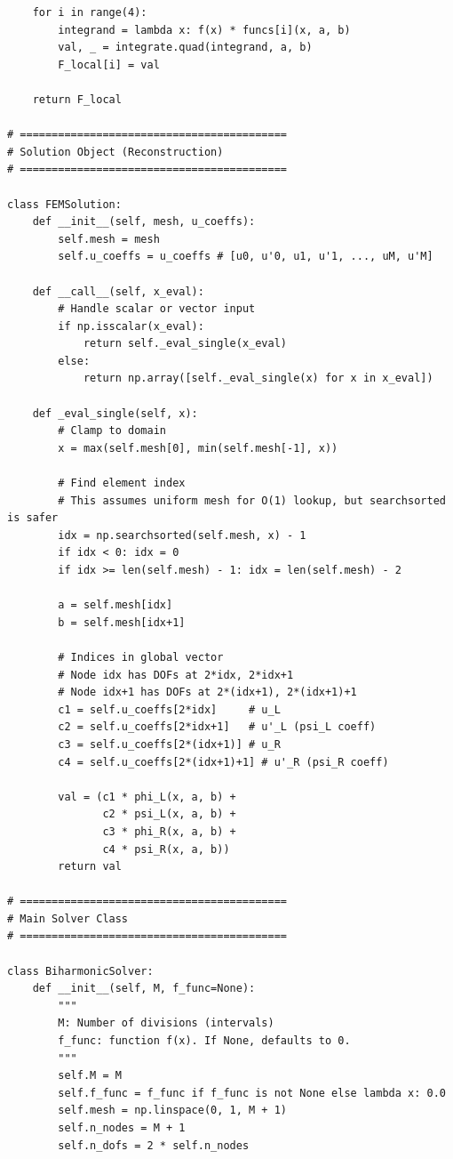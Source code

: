 \documentclass{hw-template}
\begin{document}
\begin{verbatim}
    for i in range(4):
        integrand = lambda x: f(x) * funcs[i](x, a, b)
        val, _ = integrate.quad(integrand, a, b)
        F_local[i] = val
        
    return F_local

# ==========================================
# Solution Object (Reconstruction)
# ==========================================

class FEMSolution:
    def __init__(self, mesh, u_coeffs):
        self.mesh = mesh
        self.u_coeffs = u_coeffs # [u0, u'0, u1, u'1, ..., uM, u'M]
        
    def __call__(self, x_eval):
        # Handle scalar or vector input
        if np.isscalar(x_eval):
            return self._eval_single(x_eval)
        else:
            return np.array([self._eval_single(x) for x in x_eval])
            
    def _eval_single(self, x):
        # Clamp to domain
        x = max(self.mesh[0], min(self.mesh[-1], x))
        
        # Find element index
        # This assumes uniform mesh for O(1) lookup, but searchsorted is safer
        idx = np.searchsorted(self.mesh, x) - 1
        if idx < 0: idx = 0
        if idx >= len(self.mesh) - 1: idx = len(self.mesh) - 2
        
        a = self.mesh[idx]
        b = self.mesh[idx+1]
        
        # Indices in global vector
        # Node idx has DOFs at 2*idx, 2*idx+1
        # Node idx+1 has DOFs at 2*(idx+1), 2*(idx+1)+1
        c1 = self.u_coeffs[2*idx]     # u_L
        c2 = self.u_coeffs[2*idx+1]   # u'_L (psi_L coeff)
        c3 = self.u_coeffs[2*(idx+1)] # u_R
        c4 = self.u_coeffs[2*(idx+1)+1] # u'_R (psi_R coeff)
        
        val = (c1 * phi_L(x, a, b) + 
               c2 * psi_L(x, a, b) + 
               c3 * phi_R(x, a, b) + 
               c4 * psi_R(x, a, b))
        return val

# ==========================================
# Main Solver Class
# ==========================================

class BiharmonicSolver:
    def __init__(self, M, f_func=None):
        """
        M: Number of divisions (intervals)
        f_func: function f(x). If None, defaults to 0.
        """
        self.M = M
        self.f_func = f_func if f_func is not None else lambda x: 0.0
        self.mesh = np.linspace(0, 1, M + 1)
        self.n_nodes = M + 1
        self.n_dofs = 2 * self.n_nodes
        

\end{verbatim}
\end{document}
